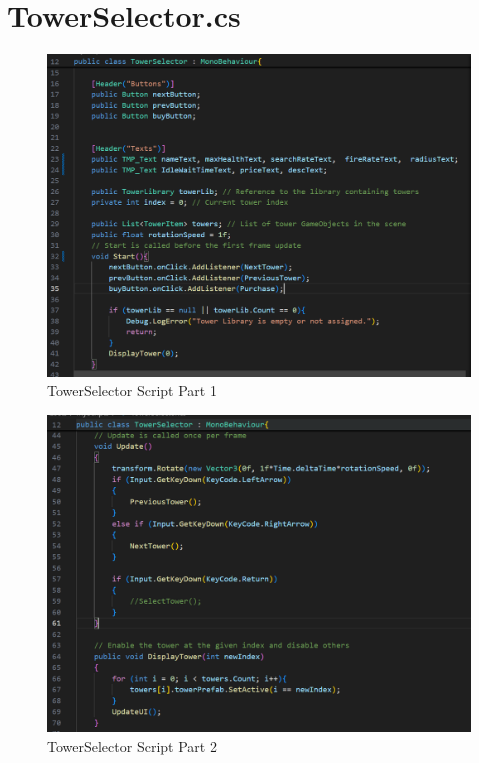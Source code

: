 \documentclass[12pt,a4paper]{report}
\begin{document}
\section{TowerSelector.cs}
\begin{figure}[h!]
	\centering
	\includegraphics[scale=0.75]{images/TowerSelector1.png}
	\caption{TowerSelector Script Part 1}
	\label{fig:TowerSelector1}
\end{figure}

\begin{figure}[h!]
	\centering
	\includegraphics[scale=0.75]{images/TowerSelector2.png}
	\caption{TowerSelector Script Part 2}
	\label{fig:TowerSelector2}
\end{figure}
\end{document}
